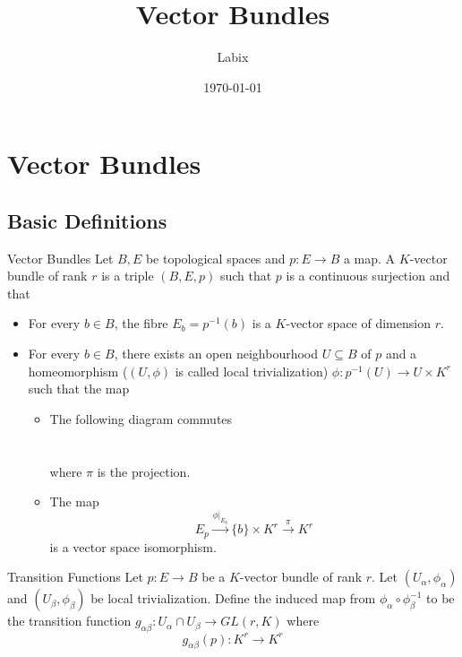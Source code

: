 \documentclass[a4paper]{article}
\title{Vector Bundles}
\author{Labix}
\date{\today}
\begin{document}
\maketitle
\begin{abstract}

\end{abstract}
\pagebreak
\tableofcontents
\pagebreak
\section{Vector Bundles}
\subsection{Basic Definitions}
\begin{defn}{Vector Bundles}{} Let $B,E$ be topological spaces and $p:E\to B$ a map. A $K$-vector bundle of rank $r$ is a triple $(B,E,p)$ such that $p$ is a continuous surjection and that 
\begin{itemize}
\item For every $b\in B$, the fibre $E_b=p^{-1}(b)$ is a $K$-vector space of dimension $r$. 
\item For every $b\in B$, there exists an open neighbourhood $U\subseteq B$ of $p$ and a homeomorphism ($(U,\phi)$ is called local trivialization) $\phi:p^{-1}(U)\to U\times K^r$ such that the map 
\begin{itemize}
\item The following diagram commutes \\~\\
 \\
where $\pi$ is the projection. 
\item The map $$E_p\overset{\phi|_{E_b}}{\longrightarrow}\{b\}\times K^r\overset{\pi}{\longrightarrow}K^r$$ is a vector space isomorphism. 
\end{itemize}
\end{itemize}
\end{defn}

\begin{defn}{Transition Functions}{} Let $p:E\to B$ be a $K$-vector bundle of rank $r$. Let $(U_\alpha,\phi_\alpha)$ and $(U_\beta,\phi_\beta)$ be local trivialization. Define the induced map from $\phi_\alpha\circ\phi_\beta^{-1}$ to be the transition function $g_{\alpha\beta}:U_\alpha\cap U_\beta\to GL(r,K)$ where $$g_{\alpha\beta}(p):K^r\to K^r$$
\end{defn}
\end{document}
